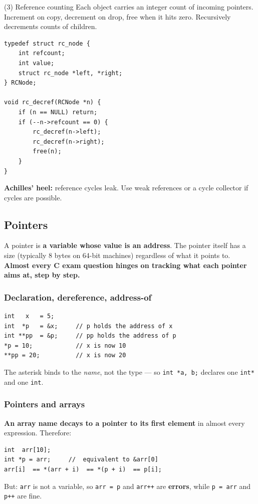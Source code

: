 \documentclass[11pt,a4paper]{article}
\begin{document}
\begin{plain}{(3) Reference counting}
Each object carries an integer count of incoming pointers. Increment on copy, decrement on drop, free when it hits zero. Recursively decrements counts of children.

\begin{lstlisting}
typedef struct rc_node {
    int refcount;
    int value;
    struct rc_node *left, *right;
} RCNode;

void rc_decref(RCNode *n) {
    if (n == NULL) return;
    if (--n->refcount == 0) {
        rc_decref(n->left);
        rc_decref(n->right);
        free(n);
    }
}
\end{lstlisting}
\textbf{Achilles' heel:} reference cycles leak. Use weak references or a cycle collector if cycles are possible.
\end{plain}

\subsection{Pointers}

\begin{must}
A pointer is \textbf{a variable whose value is an address}. The pointer itself has a size (typically 8 bytes on 64-bit machines) regardless of what it points to. \textbf{Almost every C exam question hinges on tracking what each pointer aims at, step by step.}
\end{must}

\subsubsection*{Declaration, dereference, address-of}

\begin{lstlisting}
int   x   = 5;
int  *p   = &x;     // p holds the address of x
int **pp  = &p;     // pp holds the address of p
*p = 10;            // x is now 10
**pp = 20;          // x is now 20
\end{lstlisting}

The asterisk binds to the \emph{name}, not the type --- so \verb|int *a, b;| declares one \verb|int*| and one \verb|int|.

\subsubsection*{Pointers and arrays}

\textbf{An array name decays to a pointer to its first element} in almost every expression. Therefore:
\begin{lstlisting}
int  arr[10];
int *p = arr;     //  equivalent to &arr[0]
arr[i]  == *(arr + i)  == *(p + i)  == p[i];
\end{lstlisting}
But: \texttt{arr} is not a variable, so \verb|arr = p| and \verb|arr++| are \textbf{errors}, while \verb|p = arr| and \verb|p++| are fine.
\end{document}
